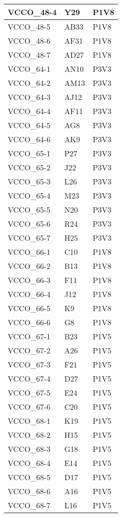 \begin{footnotesize}
\begin{longtable}{|p{7cm}|p{1cm}|p{5cm}|}
VCCO\_48-4	&	Y29	&	P1V8	\\ \hline
VCCO\_48-5	&	AB33	&	P1V8	\\ \hline
VCCO\_48-6	&	AF31	&	P1V8	\\ \hline
VCCO\_48-7	&	AD27	&	P1V8	\\ \hline
VCCO\_64-1	&	AN10	&	P3V3	\\ \hline
VCCO\_64-2	&	AM13	&	P3V3	\\ \hline
VCCO\_64-3	&	AJ12	&	P3V3	\\ \hline
VCCO\_64-4	&	AF11	&	P3V3	\\ \hline
VCCO\_64-5	&	AG8	&	P3V3	\\ \hline
VCCO\_64-6	&	AK9	&	P3V3	\\ \hline
VCCO\_65-1	&	P27	&	P3V3	\\ \hline
VCCO\_65-2	&	J22	&	P3V3	\\ \hline
VCCO\_65-3	&	L26	&	P3V3	\\ \hline
VCCO\_65-4	&	M23	&	P3V3	\\ \hline
VCCO\_65-5	&	N20	&	P3V3	\\ \hline
VCCO\_65-6	&	R24	&	P3V3	\\ \hline
VCCO\_65-7	&	H25	&	P3V3	\\ \hline
VCCO\_66-1	&	C10	&	P1V8	\\ \hline
VCCO\_66-2	&	B13	&	P1V8	\\ \hline
VCCO\_66-3	&	F11	&	P1V8	\\ \hline
VCCO\_66-4	&	J12	&	P1V8	\\ \hline
VCCO\_66-5	&	K9	&	P1V8	\\ \hline
VCCO\_66-6	&	G8	&	P1V8	\\ \hline
VCCO\_67-1	&	B23	&	P1V5	\\ \hline
VCCO\_67-2	&	A26	&	P1V5	\\ \hline
VCCO\_67-3	&	F21	&	P1V5	\\ \hline
VCCO\_67-4	&	D27	&	P1V5	\\ \hline
VCCO\_67-5	&	E24	&	P1V5	\\ \hline
VCCO\_67-6	&	C20	&	P1V5	\\ \hline
VCCO\_68-1	&	K19	&	P1V5	\\ \hline
VCCO\_68-2	&	H15	&	P1V5	\\ \hline
VCCO\_68-3	&	G18	&	P1V5	\\ \hline
VCCO\_68-4	&	E14	&	P1V5	\\ \hline
VCCO\_68-5	&	D17	&	P1V5	\\ \hline
VCCO\_68-6	&	A16	&	P1V5	\\ \hline
VCCO\_68-7	&	L16	&	P1V5	\\ \hline

\end{longtable}
\end{footnotesize}
